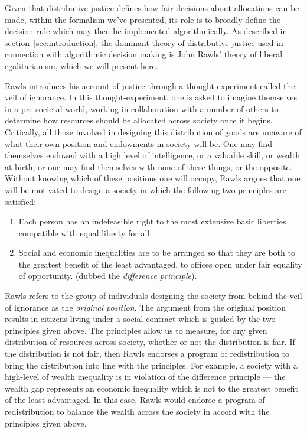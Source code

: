 Given that distributive justice defines how fair decisions about allocations can
be made, within the formalism we've presented, its role is to broadly define the
decision rule which may then be implemented algorithmically. As described in
section~\ref{sec:introduction}, the dominant theory of distributive justice used
in connection with algorithmic decision making is John Rawls' theory of liberal
egalitarianism, which we will present here.

Rawls introduces his account of justice through a thought-experiment called the
veil of ignorance. In this thought-experiment, one is asked to imagine
themselves in a pre-societal world, working in collaboration with a number of
others to determine how resources should be allocated across society once it
begins. Critically, all those involved in designing this distribution of goods
are unaware of what their own position and endowments in society will be. One
may find themselves endowed with a high level of intelligence, or a valuable
skill, or wealth at birth, or one may find themselves with none of these things,
or the opposite. Without knowing which of these positions one will occupy,
Rawls argues that one will be motivated to design a society in which the
following two principles are satisfied:

\begin{enumerate}
    \item Each person has an indefeasible right to the most extensive basic 
          liberties compatible with equal liberty for all.
    \item Social and economic inequalities are to be arranged so that they are
          both to the greatest benefit of the least advantaged, to offices
          open under fair equality of opportunity. (dubbed the
          \textit{difference principle}).
\end{enumerate}

Rawls refers to the group of individuals designing the society from behind the
veil of ignorance as the \textit{original position}. The argument from the
original position results in citizens living under a social contract which
is guided by the two principles given above. The principles allow us to measure,
for any given distribution of resources across society, whether or not the
distribution is fair. If the distribution is not fair, then Rawls endorses
a program of redistribution to bring the distribution into line with the
principles. For example, a society with a high-level of wealth inequality is
in violation of the difference principle — the wealth gap represents an economic
inequality which is not to the greatest benefit of the least advantaged. In this
case, Rawls would endorse a program of redistribution to balance the wealth
across the society in accord with the principles given above.

